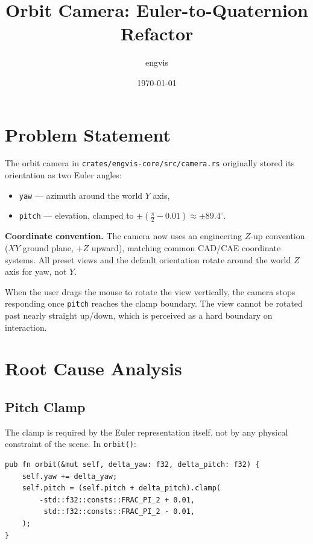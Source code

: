 \documentclass[11pt]{article}
\title{Orbit Camera: Euler-to-Quaternion Refactor}
\author{engvis}
\date{\today}
\begin{document}
\maketitle

\section{Problem Statement}

The orbit camera in \texttt{crates/engvis-core/src/camera.rs}
originally stored its orientation as two Euler angles:
\begin{itemize}
  \item \texttt{yaw} --- azimuth around the world $Y$ axis,
  \item \texttt{pitch} --- elevation, clamped to
        $\pm(\tfrac{\pi}{2} - 0.01) \approx \pm 89.4^\circ$.
\end{itemize}

\textbf{Coordinate convention.}  The camera now uses an engineering
$Z$-up convention ($XY$ ground plane, $+Z$ upward), matching common
CAD/CAE coordinate systems.  All preset views and the default
orientation rotate around the world $Z$ axis for yaw, not $Y$.

When the user drags the mouse to rotate the view vertically, the
camera stops responding once \texttt{pitch} reaches the clamp
boundary.  The view cannot be rotated past nearly straight up/down,
which is perceived as a hard boundary on interaction.

\section{Root Cause Analysis}

\subsection{Pitch Clamp}

The clamp is required by the Euler representation itself, not by any
physical constraint of the scene.  In \texttt{orbit()}:

\begin{lstlisting}
pub fn orbit(&mut self, delta_yaw: f32, delta_pitch: f32) {
    self.yaw += delta_yaw;
    self.pitch = (self.pitch + delta_pitch).clamp(
        -std::f32::consts::FRAC_PI_2 + 0.01,
         std::f32::consts::FRAC_PI_2 - 0.01,
    );
}
\end{lstlisting}
\end{document}
